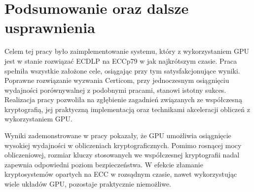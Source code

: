 \newpage  
\section{Podsumowanie oraz dalsze usprawnienia}  
Celem tej pracy było zaimplementowanie systemu,
który z wykorzystaniem GPU jest w stanie rozwiązać ECDLP na ECCp79 w jak najkrótszym czasie.
Praca spełniła wszystkie założone cele, osiągając przy tym satysfakcjonujące wyniki.
Poprawne rozwiązanie wyzwania Certicom, przy jednoczesnym osiągnięciu wydajności porównywalnej z  
podobnymi pracami, stanowi istotny sukces.
Realizacja pracy pozwoliła na zgłębienie zagadnień związanych ze współczesną  
kryptografią, jej praktyczną implementacją oraz technikami  
akceleracji obliczeń z wykorzystaniem GPU.  

Wyniki zademonstrowane w pracy pokazały, że GPU umożliwia osiągnięcie
wysokiej wydajności w obliczeniach kryptograficznych.
Pomimo rosnącej mocy obliczeniowej,
rozmiar kluczy stosowanych we współczesnej kryptografii nadal zapewnia
odpowiedni poziom bezpieczeństwa. W efekcie złamanie kryptosystemów opartych na
ECC w rozsądnym czasie, nawet wykorzystując wiele układów GPU, pozostaje praktycznie niemożliwe.


